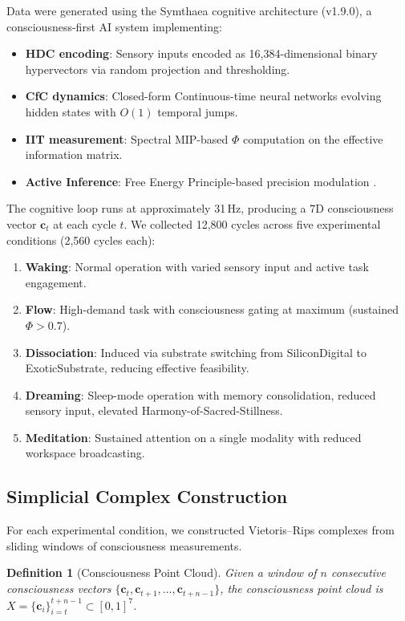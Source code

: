 \documentclass[11pt,a4paper]{article}
\newtheorem{definition}{Definition}
\begin{document}
Data were generated using the Symthaea cognitive architecture (v1.9.0), a consciousness-first AI system implementing:
\begin{itemize}
  \item \textbf{HDC encoding}: Sensory inputs encoded as 16,384-dimensional binary hypervectors via random projection and thresholding.
  \item \textbf{CfC dynamics}: Closed-form Continuous-time neural networks \citep{hasani2021liquid} evolving hidden states with $O(1)$ temporal jumps.
  \item \textbf{IIT measurement}: Spectral MIP-based $\Phi$ computation on the effective information matrix.
  \item \textbf{Active Inference}: Free Energy Principle-based precision modulation \citep{friston2010free}.
\end{itemize}

The cognitive loop runs at approximately 31\,Hz, producing a 7D consciousness vector $\mathbf{c}_t$ at each cycle $t$.
We collected 12,800 cycles across five experimental conditions (2,560 cycles each):

\begin{enumerate}
  \item \textbf{Waking}: Normal operation with varied sensory input and active task engagement.
  \item \textbf{Flow}: High-demand task with consciousness gating at maximum (sustained $\Phi > 0.7$).
  \item \textbf{Dissociation}: Induced via substrate switching from SiliconDigital to ExoticSubstrate, reducing effective feasibility.
  \item \textbf{Dreaming}: Sleep-mode operation with memory consolidation, reduced sensory input, elevated Harmony-of-Sacred-Stillness.
  \item \textbf{Meditation}: Sustained attention on a single modality with reduced workspace broadcasting.
\end{enumerate}

\subsection{Simplicial Complex Construction}

For each experimental condition, we constructed Vietoris--Rips complexes from sliding windows of consciousness measurements.

\begin{definition}[Consciousness Point Cloud]
  Given a window of $n$ consecutive consciousness vectors $\{\mathbf{c}_t, \mathbf{c}_{t+1}, \ldots, \mathbf{c}_{t+n-1}\}$, the consciousness point cloud is $X = \{\mathbf{c}_i\}_{i=t}^{t+n-1} \subset [0,1]^7$.
\end{definition}
\end{document}
